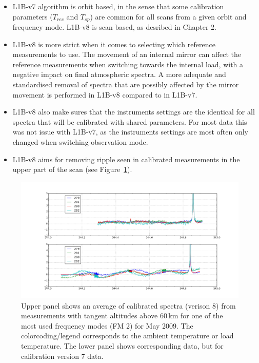 \begin{itemize}

\item L1B-v7 algorithm is orbit based, in the sense that some calibration parameters (\(T_{rec}\)
and \(T_{sp}\)) are common for all scans from a given orbit and frequency mode.
L1B-v8 is scan based, as desribed in Chapter 2.
 
\item L1B-v8 is more strict when it comes to selecting which reference measurements to use.
The movement of an internal mirror can affect the reference measurements when switching
towards the internal load, with a negative impact on final atmospheric
spectra. A more adequate and standardised removal of spectra that are possibly 
affected by the mirror movement is performed in L1B-v8 compared to in L1B-v7. 

\item L1B-v8 also make sures that the instruments settings are the identical
for all spectra that will be calibrated with shared parameters. For most data
this was not issue with L1B-v7, as the instruments settings are most often
only changed when switching observation mode.   


\item L1B-v8 aims for removing ripple seen in calibrated measurements in the
upper part of the scan (see Figure~\ref{fig:ripple}).

\end{itemize}


\begin{figure}
\includegraphics[width=14cm]{ripple_v7and8_FM2_may2009.png}
\caption{Upper panel shows an average of calibrated spectra (verison 8) from measurements
with tangent altitudes above 60\,km for one of the most used frequency modes (FM 2) for May 2009.
The colorcoding/legend corresponds to the ambient temperature or load temperature.
The lower panel shows corresponding data, but for calibration version 7 data.
 }
\label{fig:ripple}
\end{figure}




